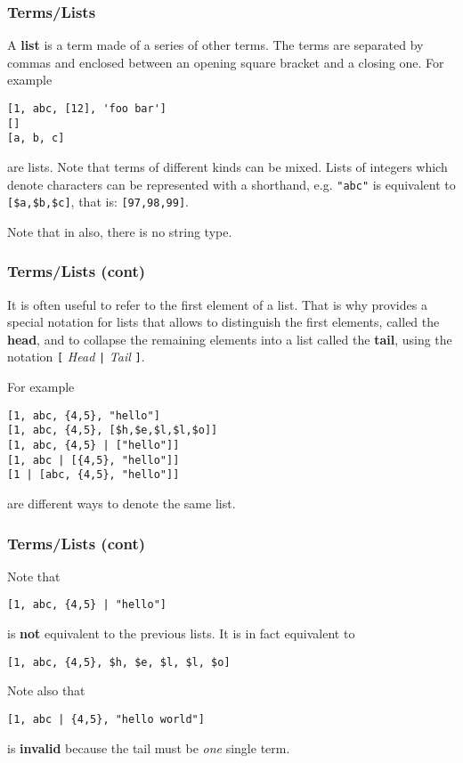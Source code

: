 %
\begin{frame}[containsverbatim]
\frametitle{Terms/Lists}

A \textbf{list} is a term made of a series of other terms. The terms
are separated by commas and enclosed between an opening square bracket
and a closing one. For example
\begin{verbatim}
[1, abc, [12], 'foo bar']
[]
[a, b, c]
\end{verbatim}
are lists. Note that terms of different kinds can be mixed. Lists of
integers which denote \ASCII characters can be represented with a
shorthand, e.g. \verb|"abc"| is equivalent to \verb|[$a,$b,$c]|, that
is: \verb|[97,98,99]|.

\bigskip

Note that in \cpp{} also, there is no string type.

\end{frame}

%
\begin{frame}[containsverbatim]
\frametitle{Terms/Lists (cont)}
\label{head_tail}

It is often useful to refer to the first element of a list. That is
why \Erlang provides a special notation for lists that allows to
distinguish the first elements, called the \textbf{head}, and to
collapse the remaining elements into a list called the \textbf{tail},
using the notation \texttt{[} \emph{Head} \texttt{|} \emph{Tail}
  \texttt{]}.

\bigskip

For example
\begin{verbatim}
[1, abc, {4,5}, "hello"]
[1, abc, {4,5}, [$h,$e,$l,$l,$o]]
[1, abc, {4,5} | ["hello"]]
[1, abc | [{4,5}, "hello"]]
[1 | [abc, {4,5}, "hello"]]
\end{verbatim}
are different ways to denote the same list. 

\end{frame}

%
\begin{frame}[containsverbatim]
\frametitle{Terms/Lists (cont)}

Note that
\begin{verbatim}
[1, abc, {4,5} | "hello"]
\end{verbatim}
is \textbf{not} equivalent to the previous lists. It is in fact
equivalent to
\begin{verbatim}
[1, abc, {4,5}, $h, $e, $l, $l, $o]
\end{verbatim}
Note also that
\begin{verbatim}
[1, abc | {4,5}, "hello world"]
\end{verbatim}
is \textbf{invalid} because the tail must be \emph{one} single term.

\end{frame}

